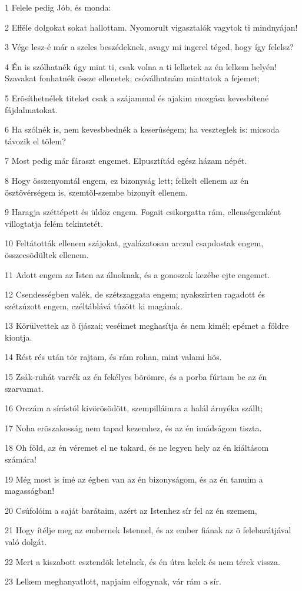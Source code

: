 \par 1 Felele pedig Jób, és monda:
\par 2 Efféle dolgokat sokat hallottam. Nyomorult vigasztalók vagytok ti mindnyájan!
\par 3 Vége lesz-é már a szeles beszédeknek, avagy mi ingerel téged, hogy így felelsz?
\par 4 Én is szólhatnék úgy mint ti, csak volna a ti lelketek az én lelkem helyén! Szavakat fonhatnék össze ellenetek; csóválhatnám miattatok a fejemet;
\par 5 Erõsíthetnélek titeket csak a szájammal és ajakim mozgása kevesbítené fájdalmatokat.
\par 6 Ha szólnék is, nem kevesbbednék a keserûségem; ha veszteglek is: micsoda távozik el tõlem?
\par 7 Most pedig már fáraszt engemet. Elpusztítád egész házam népét.
\par 8 Hogy összenyomtál engem, ez bizonyság lett; felkelt ellenem az én ösztövérségem is, szemtõl-szembe bizonyít ellenem.
\par 9 Haragja széttépett és üldöz engem. Fogait csikorgatta rám, ellenségemként villogtatja felém tekintetét.
\par 10 Feltátották ellenem szájokat, gyalázatosan arczul csapdostak engem, összecsõdültek ellenem.
\par 11 Adott engem az Isten az álnoknak, és a gonoszok kezébe ejte engemet.
\par 12 Csendességben valék, de szétszaggata engem; nyakszirten ragadott és szétzúzott engem, czéltáblává tûzött ki magának.
\par 13 Körülvettek az õ íjászai; veséimet meghasítja és nem kimél; epémet a földre kiontja.
\par 14 Rést rés után tör rajtam, és rám rohan, mint valami hõs.
\par 15 Zsák-ruhát varrék az én fekélyes bõrömre, és a porba  fúrtam be az én szarvamat.
\par 16 Orczám a sírástól kivörösödött, szempilláimra a halál árnyéka szállt;
\par 17 Noha erõszakosság nem tapad kezemhez, és az én imádságom tiszta.
\par 18 Oh föld, az én véremet el ne takard, és ne legyen hely az én kiáltásom számára!
\par 19 Még most is ímé az égben van az én bizonyságom, és az én tanuim a magasságban!
\par 20 Csúfolóim a saját barátaim, azért az Istenhez sír fel az én szemem,
\par 21 Hogy ítélje meg az embernek Istennel, és az ember fiának az õ felebarátjával való dolgát.
\par 22 Mert a kiszabott esztendõk letelnek, és én útra kelek és nem térek vissza.
\par 23 Lelkem meghanyatlott, napjaim elfogynak, vár rám a sír.

